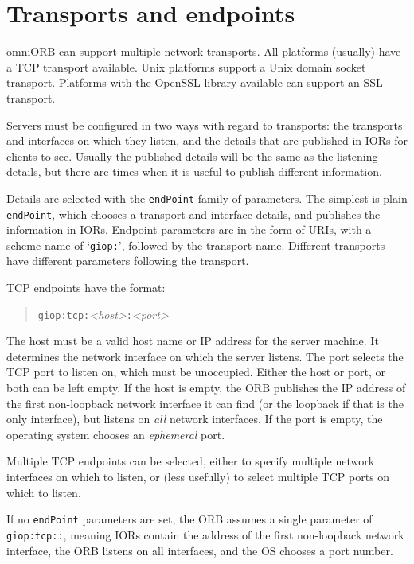 \documentclass[11pt,twoside,a4paper]{book}
\newcommand{\code}[1]{\texttt{#1}}
\newcommand{\term}[1]{\textit{#1}}
\begin{document}
\section{Transports and endpoints}
\label{sec:endpoints}

omniORB can support multiple network transports. All platforms
(usually) have a TCP transport available. Unix platforms support a
Unix domain socket transport. Platforms with the OpenSSL library
available can support an SSL transport.

Servers must be configured in two ways with regard to transports: the
transports and interfaces on which they listen, and the details that
are published in IORs for clients to see. Usually the published
details will be the same as the listening details, but there are times
when it is useful to publish different information.

Details are selected with the \code{endPoint} family of parameters.
The simplest is plain \code{endPoint}, which chooses a transport and
interface details, and publishes the information in IORs. Endpoint
parameters are in the form of URIs, with a scheme name of
`\code{giop:}', followed by the transport name. Different transports
have different parameters following the transport.

TCP endpoints have the format:

\begin{quote}
\code{giop:tcp:}\textit{<host>}\code{:}\textit{<port>}
\end{quote}

\noindent The host must be a valid host name or IP address for the
server machine.  It determines the network interface on which the
server listens. The port selects the TCP port to listen on, which must
be unoccupied.  Either the host or port, or both can be left empty. If
the host is empty, the ORB publishes the IP address of the first
non-loopback network interface it can find (or the loopback if that is
the only interface), but listens on \emph{all} network interfaces. If
the port is empty, the operating system chooses an \term{ephemeral}
port.

Multiple TCP endpoints can be selected, either to specify multiple
network interfaces on which to listen, or (less usefully) to select
multiple TCP ports on which to listen.

If no \code{endPoint} parameters are set, the ORB assumes a single
parameter of \code{giop:tcp::}, meaning IORs contain the address of
the first non-loopback network interface, the ORB listens on all
interfaces, and the OS chooses a port number.
\end{document}

